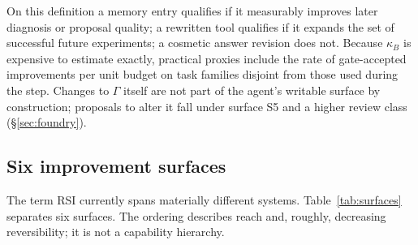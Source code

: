\documentclass[11pt,a4paper]{article}
\begin{document}
\medskip
\noindent{}
\medskip

On this definition a memory entry qualifies if it measurably improves later diagnosis or proposal quality; a rewritten tool qualifies if it expands the set of successful future experiments; a cosmetic answer revision does not. Because $\kappa_B$ is expensive to estimate exactly, practical proxies include the rate of gate-accepted improvements per unit budget on task families disjoint from those used during the step. Changes to $\Gamma$ itself are not part of the agent's writable surface by construction; proposals to alter it fall under surface S5 and a higher review class (\S\ref{sec:foundry}).

\subsection{Six improvement surfaces}\label{sec:surfaces}

The term RSI currently spans materially different systems. Table~\ref{tab:surfaces} separates six surfaces. The ordering describes reach and, roughly, decreasing reversibility; it is not a capability hierarchy.
\end{document}
